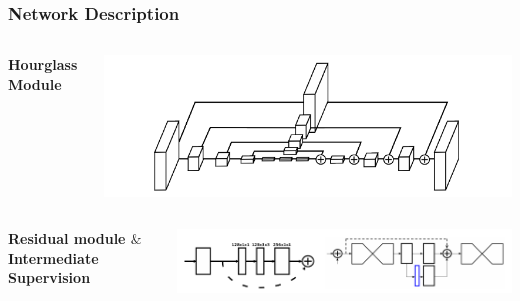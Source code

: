\documentclass{beamer}
\begin{document}
\begin{frame}
\frametitle{Network Description}

\begin{columns}
\textbf{Hourglass Module}\\


\begin{center}
\includegraphics[scale=0.4]{hourmodule.png}
\end{center}
\end{columns}
\begin{columns}

\textbf{Residual module $\&$ Intermediate Supervision }
\begin{center}
\includegraphics[scale=0.4]{residual.png}
\end{center}
\end{columns}

\end{frame}
\end{document}
